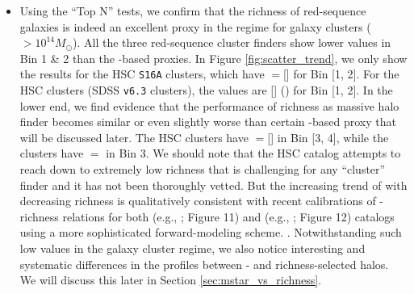 \documentclass[a4paper,fleqn,usenatbib]{mnras}
\begin{document}
\begin{itemize}
        \item Using the ``Top N'' tests, we confirm that the richness of red-sequence galaxies is indeed 
            an excellent \mvir{} proxy in the \mvir{} regime for galaxy clusters ($>10^{14} M_{\odot}$).
            All the three red-sequence cluster finders show lower \sigmh{} values in Bin 1 \& 2 
            than the \mstar{}-based \mvir{} proxies.
            In Figure \ref{fig:scatter_trend}, we only show the results for the HSC \texttt{S16A}
            \redm{} clusters, which have \sigmh{}$=$[] for Bin [1, 2]. 
            For the HSC \camira{} clusters (SDSS \redm{} \texttt{v6.3} clusters), the \sigmh{} values are 
            [] () for Bin [1, 2].
            In the lower \mvir{} end, we find evidence that the performance of richness as massive halo 
            finder becomes similar or even slightly worse than certain \mstar{}-based \mvir{} proxy that 
            will be discussed later.
            The HSC \redm{} clusters have \sigmh{}$=$[] in Bin [3, 4], while the \camira{}
            clusters have \sigmh{}$=$ in Bin 3.
            We should note that the HSC \redm{} catalog attempts to reach down to extremely low richness 
            that is challenging for any ``cluster'' finder and it has not been thoroughly vetted.
            But the increasing trend of \sigmh{} with decreasing richness is qualitatively consistent 
            with recent calibrations of \mvir{}-richness relations for both \redm{} 
            (e.g., \citealt{Murata2018}; Figure 11) and \camira{} (e.g., \citealt{Murata2019}; Figure 12)
            catalogs using a more sophisticated forward-modeling scheme.
            .
            Notwithstanding such low \sigmh{} values in the galaxy cluster regime, we also notice interesting
            and systematic differences in the \dsigma{} profiles between \mstar{}- and richness-selected 
            halos. We will discuss this later in Section \ref{sec:mstar_vs_richness}.


\end{itemize}
\end{document}
